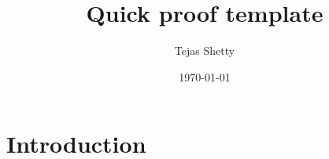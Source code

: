 \documentclass[a4paper]{article}
\title{Quick proof template}
\author{Tejas Shetty}
\date{\today}
\begin{document}
\maketitle

\section{Introduction}
\cite{petta}

%

\end{document}
